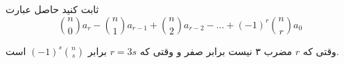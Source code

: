 ثابت کنید حاصل عبارت
$${n \choose 0}a_r - {n \choose 1}a_{r - 1} + {n \choose 2}a_{r - 2} - ... + (-1)^r{n \choose r}a_0$$

وقتی که $r$ مضرب ۳ نیست برابر صفر و وقتی که $r = 3s$ برابر $(-1)^s{n \choose s}$ است.